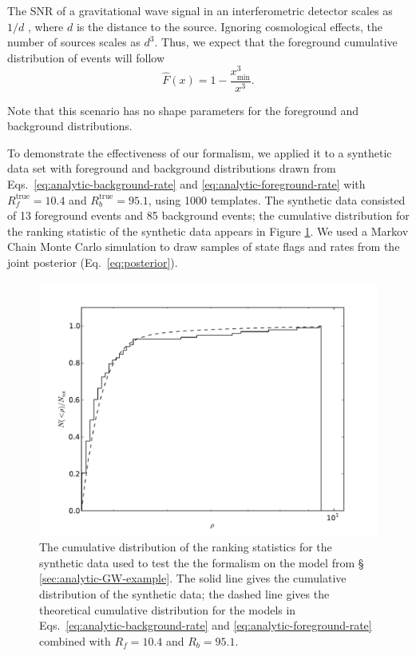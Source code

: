 \documentclass[aps,prd]{revtex4-1}
\newcommand{\xmin}{x_\mathrm{min}}
\begin{document}
The SNR of a gravitational wave signal in an interferometric detector
scales as $1/d$ \citep{Finn1992}, where $d$ is the distance to the
source.  Ignoring cosmological effects, the number of sources scales
as $d^3$.  Thus, we expect that the foreground cumulative distribution
of events will follow
\begin{equation}
  \label{eq:analytic-foreground-rate}
  \hat{F}(x) = 1 - \frac{\xmin^3}{x^3}.
\end{equation}

Note that this scenario has no shape parameters for the foreground and
background distributions.

To demonstrate the effectiveness of our formalism, we applied it to a
synthetic data set with foreground and background distributions drawn
from Eqs.~\eqref{eq:analytic-background-rate} and
\eqref{eq:analytic-foreground-rate} with $R_f^\mathrm{true} = 10.4$
and $R_b^\mathrm{true} = 95.1$, using 1000 templates.  The synthetic
data consisted of 13 foreground events and 85 background events; the
cumulative distribution for the ranking statistic of the synthetic
data appears in Figure \ref{fig:analytic-data-cumulative}.  We used a
Markov Chain Monte Carlo simulation to draw samples of state flags and
rates from the joint posterior (Eq.~\eqref{eq:posterior}).

\begin{figure}
  \includegraphics[width=\columnwidth]{data}
  \caption{\label{fig:analytic-data-cumulative} The cumulative
    distribution of the ranking statistics for the synthetic data used
    to test the the formalism on the model from \S
    \ref{sec:analytic-GW-example}.  The solid line gives the
    cumulative distribution of the synthetic data; the dashed line
    gives the theoretical cumulative distribution for the models in
    Eqs.~\eqref{eq:analytic-background-rate} and
    \eqref{eq:analytic-foreground-rate} combined with $R_f = 10.4$ and
    $R_b = 95.1$.}
\end{figure}
\end{document}
